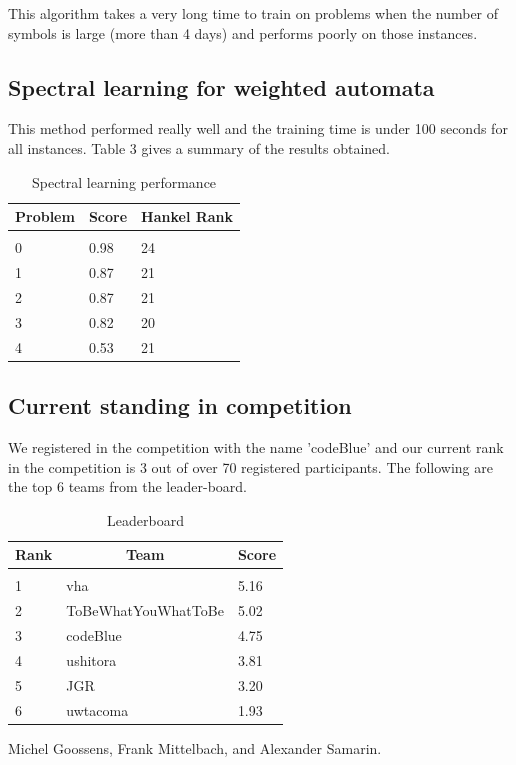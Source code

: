 \documentclass[letterpaper]{article}
\begin{document}
This algorithm takes a very long time to train on problems when the number of symbols is large (more than 4 days) and performs poorly on those instances.

\subsection{Spectral learning for weighted automata}

This method performed really well and the training time is under 100 seconds for all instances. Table 3 gives a summary of the results obtained.

\begin{table}[h]
\caption{Spectral learning performance}
\label{sample-table}
\begin{center}
\begin{tabular}{lll}
\multicolumn{1}{c}{\bf Problem}  &\multicolumn{1}{c}{\bf Score} &\multicolumn{1}{c}{\bf Hankel Rank}\\
\hline \\
0	&0.98	&24\\
1	&0.87	&21\\
2	&0.87	&21\\
3	&0.82	&20\\
4	&0.53	&21\\
\end{tabular}
\end{center}
\end{table}

\subsection{Current standing in competition}

We registered in the competition with the name 'codeBlue' and our current rank in the competition is 3 out of over 70 registered participants. The following are the top 6 teams from the leader-board.

\begin{table}[h]
\caption{Leaderboard}
\label{sample-table}
\begin{center}
\begin{tabular}{lll}
\multicolumn{1}{c}{\bf Rank}  &\multicolumn{1}{c}{\bf Team} &\multicolumn{1}{c}{\bf Score}\\
\hline \\
1	&vha						&5.16\\
2	&ToBeWhatYouWhatToBe		&5.02\\
3	&codeBlue					&4.75\\
4	&ushitora					&3.81\\
5	&JGR						&3.20\\
6	&uwtacoma					&1.93\\
\end{tabular}
\end{center}
\end{table}

\newpage



\begin{thebibliography}{9}

Michel Goossens, Frank Mittelbach, and Alexander Samarin. 


\end{thebibliography}
\end{document}
